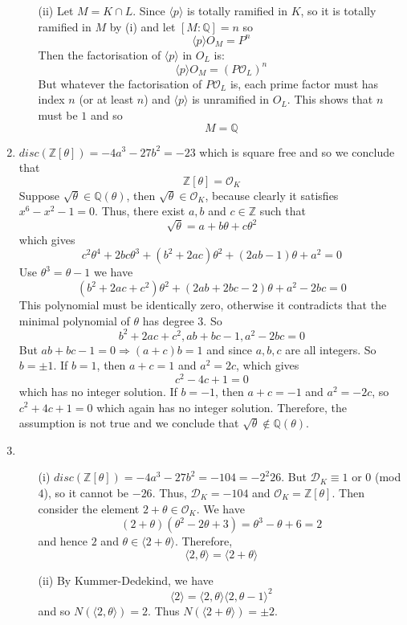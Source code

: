 \begin{enumerate}
\begin{enumerate}
\item[(ii)] Let $M=K \cap L$. Since $\langle p \rangle$ is totally ramified in $K$, so it is totally ramified in $M$ by (i) and let $[M:\mathbb{Q}]=n$ so
$$\langle p \rangle O_M=P^n$$
Then the factorisation of $\langle p \rangle$ in $O_L$ is:
$$\langle p \rangle O_M=(P\mathcal{O}_L)^n$$
But whatever the factorisation of $P\mathcal{O}_L$ is, each prime factor must has index $n$ (or at least $n$)
and $\langle p \rangle$ is unramified in $O_L$. This shows that $n$ must be $1$ and so
$$M=\mathbb{Q}$$
\end{enumerate}
\item $disc(\mathbb{Z}[\theta])=-4a^3-27b^2=-23$ which is square free and so we conclude that
$$\mathbb{Z}[\theta]=\mathcal{O}_K$$
Suppose $\sqrt{\theta} \in \mathbb{Q}(\theta)$, then $\sqrt{\theta} \in \mathcal{O}_K$, because clearly it satisfies $x^6-x^2-1=0$.
Thus, there exist $a,b$ and $c \in \mathbb{Z}$ such that
$$\sqrt{\theta}=a+b\theta+c\theta^2$$
which gives
$$c^2 \theta^4+2bc\theta^3+(b^2+2ac)\theta^2+(2ab-1)\theta+a^2=0$$
Use $\theta^3=\theta-1$ we have
$$(b^2+2ac+c^2)\theta^2+(2ab+2bc-2)\theta+a^2-2bc=0$$
This polynomial must be identically zero, otherwise it contradicts that the minimal polynomial of $\theta$ has degree $3$. So
$$b^2+2ac+c^2,ab+bc-1,a^2-2bc=0$$
But $ab+bc-1=0 \Rightarrow (a+c)b=1$ and since $a,b,c$ are all integers. So $b=\pm 1$.
If $b=1$, then $a+c=1$ and $a^2=2c$, which gives
$$c^2-4c+1=0$$ which has no integer solution. If $b=-1$, then
$a+c=-1$ and $a^2=-2c$, so $c^2+4c+1=0$ which again has no integer solution. Therefore, the assumption is not true and we conclude that $\sqrt{\theta} \not \in \mathbb{Q}(\theta)$.
\item
\begin{enumerate}
\item[(i)] $disc(\mathbb{Z}[\theta])=-4a^3-27b^2=-104=-2^2 26$.
But $\mathcal{D}_K \equiv 1$ or $0$ (mod $4$), so it cannot be $-26$. Thus, $\mathcal{D}_K=-104$ and
$\mathcal{O}_K=\mathbb{Z}[\theta]$. Then consider the element $2+\theta \in \mathcal{O}_K$.
We have
$$(2+\theta)(\theta^2-2\theta+3)=\theta^3-\theta+6=2$$
and hence $2$ and $\theta \in \langle 2+\theta \rangle$. Therefore,
$$\langle 2, \theta \rangle=\langle 2+\theta \rangle$$
\item[(ii)] By Kummer-Dedekind, we have
$$\langle 2 \rangle =\langle 2,\theta \rangle \langle 2, \theta-1 \rangle^2$$
and so $N(\langle 2,\theta \rangle)=2$. Thus $N(\langle 2+\theta \rangle)=\pm 2$.
\end{enumerate}
\end{enumerate}
